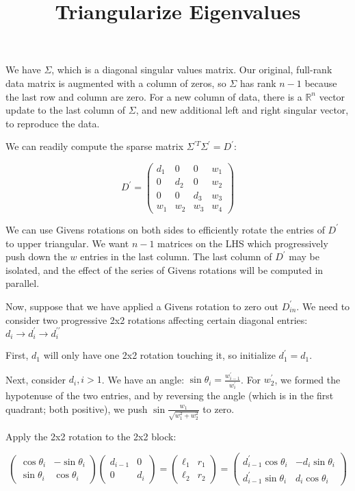 \documentclass{article}
\title{Triangularize Eigenvalues}
\begin{document}
	
\maketitle

We have $\Sigma$, which is a diagonal singular values matrix. Our original, full-rank data matrix is augmented with a column of zeros, so $\Sigma$ has rank $n-1$ because the last row and column are zero. For a new column of data, there is a $\mathbb{R}^n$ vector update to the last column of $\Sigma$, and new additional left and right singular vector, to reproduce the data.

We can readily compute the sparse matrix $\Sigma^{\prime T} \Sigma^\prime = D^\prime$:

$$
D^\prime =
\left(\begin{matrix}
d_1 & 0 & 0 & w_1 \\
0 & d_2 & 0 & w_2 \\
0 & 0 & d_3 & w_3 \\
w_1 & w_2 & w_3 & w_4
\end{matrix}\right)
$$

We can use Givens rotations on both sides to efficiently rotate the entries of $D^\prime$ to upper triangular. We want $n-1$ matrices on the LHS which progressively push down the $w$ entries in the last column. The last column of $D^\prime$ may be isolated, and the effect of the series of Givens rotations will be computed in parallel.

Now, suppose that we have applied a Givens rotation to zero out $D^\prime_{in}$. We need to consider two progressive 2x2 rotations affecting certain diagonal entries: $d_i \to d_i^\prime \to d_i^{\prime\prime}$

First, $d_1$ will only have one 2x2 rotation touching it, so initialize $d_1^\prime = d_1$.

Next, consider $d_i, i > 1$. We have an angle: $\sin \theta_i = \frac{w_{i-1}^\prime}{w_i^\prime}$. For $w_2^\prime$, we formed the hypotenuse of the two entries, and by reversing the angle (which is in the first quadrant; both positive), we push $\sin \frac{w_1}{\sqrt{w_1^2+w_2^2}}$ to zero.

Apply the 2x2 rotation to the 2x2 block:

$$
\left(
\begin{matrix}
\cos \theta_i & -\sin\theta_i \\
\sin\theta_i & \cos\theta_i
\end{matrix}
\right)
\left(\begin{matrix}
d_{i-1} & 0 \\
0 & d_i \end{matrix}\right)
=
\left(\begin{matrix}
	\ell_1 & r_1 \\ \ell_2 & r_2
\end{matrix}\right)
=
\left(\begin{matrix}
	d_{i-1}^\prime\cos\theta_i
	&
	-d_i \sin\theta_i
	\\
	d_{i-1}^\prime\sin\theta_i
	&
	d_i\cos\theta_i
\end{matrix}\right)
$$
\end{document}
